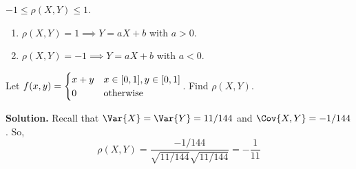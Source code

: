 \begin{Theorem}{}{}
    $ -1\leqslant \rho(X,Y)\leqslant 1 $.
    \begin{enumerate}[label=(\arabic*)]
        \item $ \rho(X,Y)=1\implies Y=aX+b $ with $ a>0 $.
        \item $ \rho(X,Y)=-1\implies Y=aX+b $ with $ a<0 $.
    \end{enumerate}
\end{Theorem}
\begin{Example}{}{}
    Let $ \displaystyle f(x,y)=\begin{cases}
            x+y & x\in\interval{0}{1},y\in\interval{0}{1} \\
            0   & \text{otherwise}
        \end{cases} $.
    Find $ \rho(X,Y) $.

    \textbf{Solution.} Recall that $ \Var{X}=\Var{Y}=11/144 $
    and $ \Cov{X,Y}=-1/144 $. So,
    \[ \rho(X,Y)=\frac{-1/144}{\sqrt{11/144}\sqrt{11/144}} =-\frac{1}{11}  \]

\end{Example}
